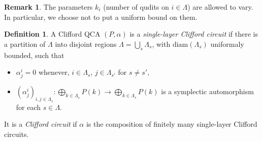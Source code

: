 \documentclass{article}
\theoremstyle{definition}
\newtheorem{defn}[theorem]{Definition}
\newtheorem{rmk}[theorem]{Remark}
\begin{document}
\begin{rmk}
    The parameters $k_i$ (number of qudits on $i\in \Lambda$) are allowed to vary. In particular, we choose not to put a uniform bound on them. 
\end{rmk}

\begin{defn}
    A Clifford QCA $(P, \alpha)$ is a \emph{single-layer Clifford circuit} if there is a partition of $\Lambda$ into disjoint regions $\Lambda=\bigcup_{s}\Lambda_s$, with $\mathrm{diam}(\Lambda_s)$ uniformaly bounded, such that
    \begin{itemize}
        \item $\alpha_j^i=0$ whenever, $i\in \Lambda_s$, $j\in \Lambda_{s'}$ for $s\ne s',$
        \item $(\alpha_j^i)_{i, j \in \Lambda_s}: \bigoplus_{k\in \Lambda_s} P(k) \rightarrow \bigoplus_{k\in \Lambda_s} P(k)$ is a symplectic automorphism for each $s\in \Lambda$. 
        
    \end{itemize}
    It is a \emph{Clifford circuit} if $\alpha$ is the composition of finitely many single-layer Clifford circuits. 
\end{defn}
\end{document}
